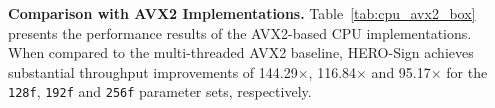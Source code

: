 \documentclass[10pt,conference]{IEEEtran}
\begin{document}
\begin{table}[t]
\centering
\caption{CPU AVX2 Performance Comparison (KOPS)\cite{alter2021optimizing}}
\label{tab:cpu_avx2_box}
\end{table}


\textbf{Comparison with AVX2 Implementations.}
Table~\ref{tab:cpu_avx2_box} presents the performance results of the AVX2-based CPU implementations\cite{alter2021optimizing}. 
When compared to the multi-threaded AVX2 baseline, HERO-Sign achieves substantial throughput improvements of 
144.29$\times$, 116.84$\times$ and 95.17$\times$ 
for the \texttt{128f}, \texttt{192f} and \texttt{256f} parameter sets, respectively.






\end{document}
